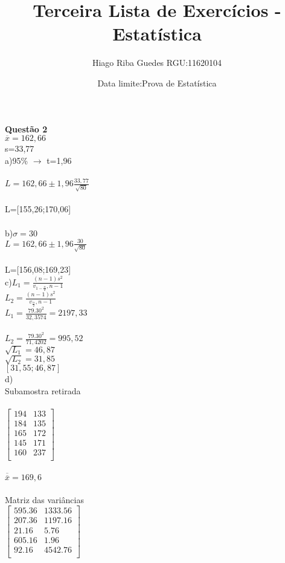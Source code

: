 \documentclass{article}
\title{Terceira Lista de Exerc\'icios -Estat\'istica}
\author{Hiago Riba Guedes RGU:11620104}
\date{Data limite:Prova de Estatística }
\begin{document}
\maketitle
\textbf{Quest\~ao 2}\\
$\overline{x}=162,66$\\
s=33,77\\
a)95\% $\to$ t=1,96\\\\
$L=162,66 \pm 1,96\frac{33,77}{\sqrt{80}}$\\\\
L=[155,26;170,06]\\\\
b)$\sigma =30$\\
$L=162,66 \pm 1,96\frac{30}{\sqrt{80}}$\\\\
L=[156,08;169,23]\\
c)$L_1=\frac{(n-1)s^2}{v_{1-\frac{\alpha}{2}},n-1}$\\
$L_2=\frac{(n-1)s^2}{v_{\frac{\alpha}{2}},n-1}$\\
$L_1=\frac{79.30^2}{32,3574}=2197,33$\\\\
$L_2=\frac{79.30^2}{71,4202}=995,52$\\
$\sqrt{L_1}=46,87$\\
$\sqrt{L_2}=31,85$ \\
$[31,55;46,87]$\\
d)\\
Subamostra retirada\\\\
$\left[\begin{array}{ccrll}
 194 & 133\\
 184 & 135\\
 165 & 172\\
 145 & 171\\
 160 & 237\\
\end{array}\right]$
\\\\
$\overline{\overline{x}}=169,6$\\
\\
Matriz das vari\^ancias\\
$\left[\begin{array}{ccrll}
 595.36 & 1333.56\\
 207.36 & 1197.16\\
 21.16 & 5.76\\
 605.16 & 1.96\\
 92.16 & 4542.76\\
\end{array}\right]$
\end{document}
